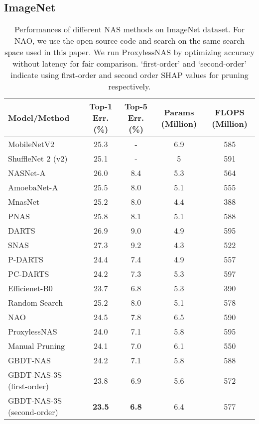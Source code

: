 \documentclass{article}
\begin{document}
\subsection{ImageNet}
\begin{table}[htbp]
\centering
\small
\caption{Performances of different NAS methods on ImageNet dataset. For NAO, we use the open source code and search on the same search space used in this paper. We run ProxylessNAS by optimizing accuracy without latency for fair comparison. `first-order' and `second-order' indicate using first-order and second order SHAP values for pruning respectively.}
\begin{tabular}{lcccc}
\toprule
Model/Method                      & Top-1 Err. (\%) & Top-5 Err. (\%) & Params (Million) & FLOPS (Million) \\ 
\midrule
MobileNetV2~\cite{mobilenetv2}               & 25.3      & -        & 6.9  & 585 \\
ShuffleNet 2 (v2)~\cite{shufflenet}  & 25.1      & -        &  5 & 591  \\
\midrule
NASNet-A~\cite{nas}               & 26.0      & 8.4       & 5.3       & 564 \\
AmoebaNet-A~\cite{amoebanet}      & 25.5      & 8.0       & 5.1       & 555 \\
MnasNet~\cite{mnasnet}            & 25.2      & 8.0       & 4.4       & 388 \\
PNAS~\cite{PNAS}                  & 25.8      & 8.1       & 5.1       & 588 \\
DARTS~\cite{darts}                & 26.9      & 9.0       & 4.9       & 595 \\
SNAS~\cite{snas}                  & 27.3      & 9.2       & 4.3       & 522\\
P-DARTS~\cite{pdarts}             & 24.4      & 7.4       & 4.9       & 557\\
PC-DARTS~\cite{pcdarts}           & 24.2      & 7.3       & 5.3       & 597\\
Efficienet-B0~\cite{efficientnet} & 23.7     & 6.8       & 5.3       & 390 \\
\midrule
Random Search                    & 25.2    & 8.0     & 5.1   & 578 \\
NAO~\cite{nao}             & 24.5    & 7.8     & 6.5   & 590 \\
ProxylessNAS~\cite{proxylessnas}  & 24.0      & 7.1       & 5.8       & 595\\
Manual Pruning                   & 24.1    & 7.0     & 6.1   & 550 \\
\midrule 
GBDT-NAS                      & 24.2    & 7.1   & 5.8      & 588 \\
GBDT-NAS-3S (first-order)   & 23.8    & 6.9   & 5.6      & 572 \\
GBDT-NAS-3S (second-order)  & \textbf{23.5} & \textbf{6.8}     & 6.4 & 577 \\
\bottomrule
\end{tabular}
\label{tbl:ImageNet}
\end{table}
\end{document}
